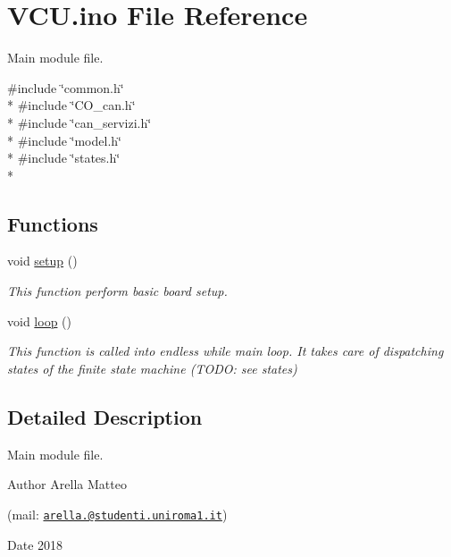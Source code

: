\hypertarget{_v_c_u_8ino}{\section{V\-C\-U.\-ino File Reference}
\label{_v_c_u_8ino}
}


Main module file.  


{\ttfamily \#include \char`\"{}common.\-h\char`\"{}}\\*
{\ttfamily \#include \char`\"{}C\-O\-\_\-can.\-h\char`\"{}}\\*
{\ttfamily \#include \char`\"{}can\-\_\-servizi.\-h\char`\"{}}\\*
{\ttfamily \#include \char`\"{}model.\-h\char`\"{}}\\*
{\ttfamily \#include \char`\"{}states.\-h\char`\"{}}\\*
\subsection*{Functions}
\begin{DoxyCompactItemize}
\item 
void \hyperlink{_v_c_u_8ino_a4fc01d736fe50cf5b977f755b675f11d}{setup} ()
\begin{DoxyCompactList}\small\item\em This function perform basic board setup. \end{DoxyCompactList}\item 
void \hyperlink{_v_c_u_8ino_afe461d27b9c48d5921c00d521181f12f}{loop} ()
\begin{DoxyCompactList}\small\item\em This function is called into endless while main loop. It takes care of dispatching states of the finite state machine (T\-O\-D\-O\-: see states) \end{DoxyCompactList}\end{DoxyCompactItemize}


\subsection{Detailed Description}
Main module file. \begin{DoxyAuthor}{Author}
Arella Matteo \par
 (mail\-: \href{mailto:arella.1646983@studenti.uniroma1.it}{\tt arella.@studenti.\-uniroma1.\-it}) 
\end{DoxyAuthor}
\begin{DoxyDate}{Date}
2018 
\end{DoxyDate}


